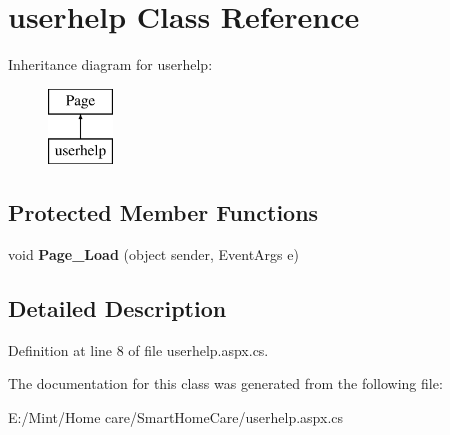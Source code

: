 \hypertarget{classuserhelp}{\section{userhelp Class Reference}
\label{classuserhelp}
}
Inheritance diagram for userhelp\-:\begin{figure}[H]
\begin{center}
\leavevmode
\includegraphics[height=2.000000cm]{classuserhelp}
\end{center}
\end{figure}
\subsection*{Protected Member Functions}
\begin{DoxyCompactItemize}
\item 
\hypertarget{classuserhelp_a2ef8f8b48dd538c14996ecb0a73bc777}{void {\bfseries Page\-\_\-\-Load} (object sender, Event\-Args e)}\label{classuserhelp_a2ef8f8b48dd538c14996ecb0a73bc777}

\end{DoxyCompactItemize}


\subsection{Detailed Description}


Definition at line 8 of file userhelp.\-aspx.\-cs.



The documentation for this class was generated from the following file\-:\begin{DoxyCompactItemize}
\item 
E\-:/\-Mint/\-Home care/\-Smart\-Home\-Care/userhelp.\-aspx.\-cs\end{DoxyCompactItemize}
